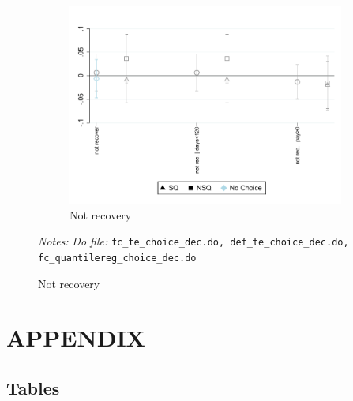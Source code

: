 \documentclass[11pt]{article}
\begin{document}
\begin{figure}[H]
\begin{center}
\begin{subfigure}{0.45\textwidth}
        \caption{Not recovery}
        \centering
        \includegraphics[width=\textwidth]{Figuras/def_te_pro_5.pdf}
    \end{subfigure}
    \end{center}
             \footnotesize \textit{Notes: } 
      \footnotesize{ } \textit{Do file: }  \texttt{fc\_te\_choice\_dec.do, def\_te\_choice\_dec.do, fc\_quantilereg\_choice\_dec.do}
\end{figure}


\pagebreak




\section{APPENDIX}

\subsection{Tables}
\end{document}
